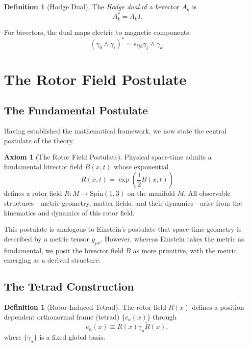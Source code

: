 \documentclass[11pt,a4paper]{article}
\numberwithin{equation}{section}
\theoremstyle{plain}
\theoremstyle{definition}
\newtheorem{definition}[theorem]{Definition}
\newtheorem{axiom}[theorem]{Axiom}
\theoremstyle{remark}
\newcommand{\rev}[1]{\widetilde{#1}}       %
\newcommand{\dual}[1]{#1^\ast}             %
\newcommand{\Spin}{\mathrm{Spin}}
\begin{document}
\begin{definition}[Hodge Dual]
The \emph{Hodge dual} of a $k$-vector $A_k$ is
\begin{equation}
\dual{A_k} = A_k I.
\end{equation}
\end{definition}

For bivectors, the dual maps electric to magnetic components:
\begin{equation}
\dual{(\gamma_0 \wedge \gamma_i)} = \epsilon_{ijk}\gamma_j \wedge \gamma_k.
\end{equation}

\section{The Rotor Field Postulate}
\label{sec:rotor-postulate}

\subsection{The Fundamental Postulate}

Having established the mathematical framework, we now state the central postulate of the theory.

\begin{axiom}[The Rotor Field Postulate]
Physical space-time admits a fundamental bivector field $B(x,t)$ whose exponential
\begin{equation}
R(x,t) = \exp\left(\frac{1}{2}B(x,t)\right)
\label{eq:rotor-field-def}
\end{equation}
defines a rotor field $R: M \to \Spin(1,3)$ on the manifold $M$. All observable structures—metric geometry, matter fields, and their dynamics—arise from the kinematics and dynamics of this rotor field.
\end{axiom}

This postulate is analogous to Einstein's postulate that space-time geometry is described by a metric tensor $g_{\mu\nu}$. However, whereas Einstein takes the metric as fundamental, we posit the bivector field $B$ as more primitive, with the metric emerging as a derived structure.

\subsection{The Tetrad Construction}

\begin{definition}[Rotor-Induced Tetrad]
The rotor field $R(x)$ defines a position-dependent orthonormal frame (tetrad) $\{e_a(x)\}$ through
\begin{equation}
e_a(x) \equiv R(x) \gamma_a \rev{R}(x),
\label{eq:tetrad-construction}
\end{equation}
where $\{\gamma_a\}$ is a fixed global basis.
\end{definition}
\end{document}
